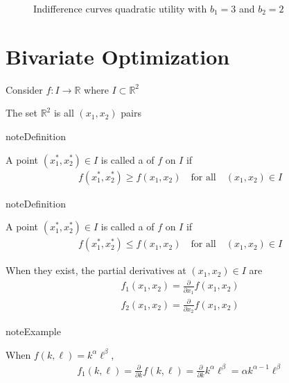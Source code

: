 \documentclass[letterpaper,10pt,english]{jupyterBook}
\begin{document}
\begin{figure}[htbp]
\centering
\capstart

\noindent{}
\caption{Indifference curves quadratic utility with \(b_1 = 3\) and \(b_2 = 2\)}\label{\detokenize{02.optimization_intro:id16}}\end{figure}


\section{Bivariate Optimization}
\label{\detokenize{02.optimization_intro:bivariate-optimization}}
\sphinxAtStartPar
Consider \(f \colon I \to \mathbb{R}\) where \(I \subset \mathbb{R}^2\)

\sphinxAtStartPar
The set \(\mathbb{R}^2\) is all \((x_1, x_2)\) pairs

\begin{sphinxadmonition}{note}{Definition}

\sphinxAtStartPar
A point \((x_1^*, x_2^*) \in I\) is called a  of \(f\) on \(I\) if
\begin{equation*}
\begin{split}
f(x_1^*, x_2^*) \geq f(x_1, x_2) 
\quad \text{for all} \quad
(x_1, x_2) \in I
\end{split}
\end{equation*}\end{sphinxadmonition}

\begin{sphinxadmonition}{note}{Definition}

\sphinxAtStartPar
A point \((x_1^*, x_2^*) \in I\) is called a  of \(f\) on \(I\) if
\begin{equation*}
\begin{split}
f(x_1^*, x_2^*) \leq f(x_1, x_2) 
\quad \text{for all} \quad
(x_1, x_2) \in I
\end{split}
\end{equation*}\end{sphinxadmonition}

\sphinxAtStartPar
When they exist, the partial derivatives at \((x_1, x_2) \in I\) are
\begin{equation*}
\begin{split}
f_1(x_1, x_2) = \frac{\partial}{\partial x_1} f(x_1, x_2)
\\
f_2(x_1, x_2) = \frac{\partial}{\partial x_2} f(x_1, x_2)
\end{split}
\end{equation*}
\begin{sphinxadmonition}{note}{Example}

\sphinxAtStartPar
When \(f(k, \ell) = k^\alpha \ell^\beta\),
\begin{equation*}
\begin{split}
f_1(k, \ell) 
= \frac{\partial}{\partial k} f(k, \ell)
= \frac{\partial}{\partial k} k^\alpha \ell^\beta
= \alpha k^{\alpha-1} \ell^\beta
\end{split}
\end{equation*}\end{sphinxadmonition}
\end{document}
